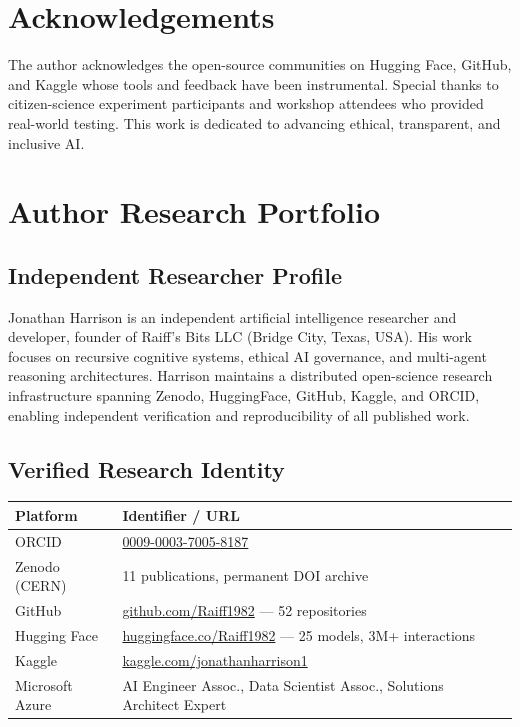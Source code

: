 \documentclass[11pt,a4paper]{article}
\begin{document}
\section*{Acknowledgements}
The author acknowledges the open-source communities on Hugging Face, GitHub, and Kaggle whose tools and feedback have been instrumental. Special thanks to citizen-science experiment participants and workshop attendees who provided real-world testing. This work is dedicated to advancing ethical, transparent, and inclusive AI.



\clearpage
\appendix
\section{Author Research Portfolio}
\label{app:portfolio}

\subsection{Independent Researcher Profile}
Jonathan Harrison is an independent artificial intelligence researcher and developer, founder of Raiff's Bits LLC (Bridge City, Texas, USA). His work focuses on recursive cognitive systems, ethical AI governance, and multi-agent reasoning architectures. Harrison maintains a distributed open-science research infrastructure spanning Zenodo, HuggingFace, GitHub, Kaggle, and ORCID, enabling independent verification and reproducibility of all published work.

\subsection{Verified Research Identity}
\begin{table}[H]
\centering
\begin{tabular}{@{}ll@{}}
\toprule
\textbf{Platform} & \textbf{Identifier / URL} \\
\midrule
ORCID         & \href{https://orcid.org/0009-0003-7005-8187}{0009-0003-7005-8187} \\
Zenodo (CERN) & 11 publications, permanent DOI archive \\
GitHub        & \href{https://github.com/Raiff1982}{github.com/Raiff1982} --- 52 repositories \\
Hugging Face  & \href{https://huggingface.co/Raiff1982}{huggingface.co/Raiff1982} --- 25 models, 3M+ interactions \\
Kaggle        & \href{https://kaggle.com/jonathanharrison1}{kaggle.com/jonathanharrison1} \\
Microsoft Azure & AI Engineer Assoc., Data Scientist Assoc., Solutions Architect Expert \\
\bottomrule
\end{tabular}
\end{table}
\end{document}
